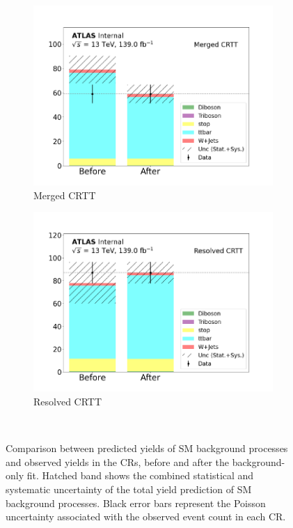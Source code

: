 \begin{figure}[h]
\begin{subfigure}{0.45\textwidth}
    \includegraphics[width=\textwidth]{Figures/8/CRTT_Merged_before_after.pdf}
    \caption{Merged CRTT}\label{fig:before_after_CRTT_merged}
  \end{subfigure} \hspace{1em}
  \begin{subfigure}{0.45\textwidth}
    \includegraphics[width=\textwidth]{Figures/8/CRTT_Resolved_before_after.pdf}
    \caption{Resolved CRTT}\label{fig:before_after_CRTT_resolved}
  \end{subfigure} \\ \vspace{1em}
  \caption[]{Comparison between predicted yields of SM background processes and observed yields in the CRs, before and after the background-only fit. Hatched band shows the combined statistical and systematic uncertainty of the total yield prediction of SM background processes. Black error bars represent the Poisson uncertainty associated with the observed event count in each CR.}
  \label{fig:before_after_CRs}
\end{figure}

